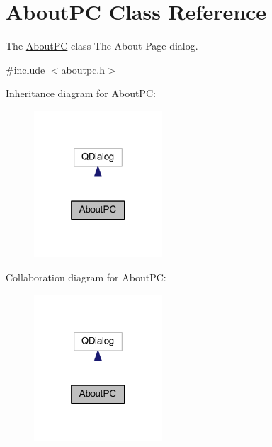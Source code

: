 \hypertarget{class_about_p_c}{}\section{About\+PC Class Reference}
\label{class_about_p_c}


The \mbox{\hyperlink{class_about_p_c}{About\+PC}} class The About Page dialog.  




{\ttfamily \#include $<$aboutpc.\+h$>$}



Inheritance diagram for About\+PC\+:
\nopagebreak
\begin{figure}[H]
\begin{center}
\leavevmode
\includegraphics[width=136pt]{class_about_p_c__inherit__graph}
\end{center}
\end{figure}


Collaboration diagram for About\+PC\+:
\nopagebreak
\begin{figure}[H]
\begin{center}
\leavevmode
\includegraphics[width=136pt]{class_about_p_c__coll__graph}
\end{center}
\end{figure}
